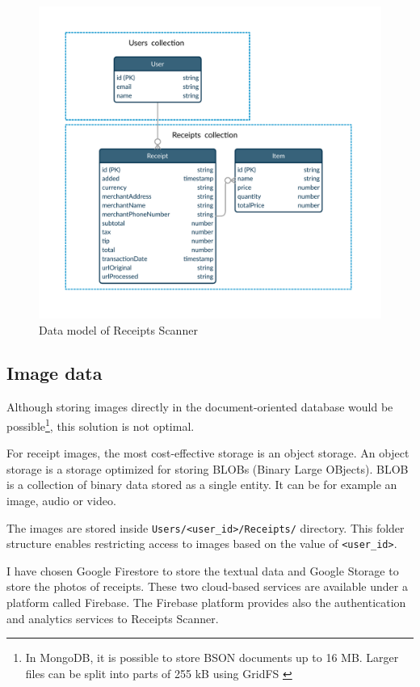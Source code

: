 \documentclass[
  digital, %
  table,   %
  oneside, %
  lof,     %
  lot,     %
]{fithesis3}
\begin{document}
    \begin{figure}
        \begin{center}
            \includegraphics[width=\textwidth]{figures/other/data_model_firestore}
        \end{center}
        \caption{Data model of Receipts Scanner}
        \label{fig:data_model_firestore}
    \end{figure}

\subsection{Image data}
Although storing images directly in the document-oriented database would be possible\footnote{In MongoDB, it is possible to store BSON documents up to 16 MB. Larger files can be split into parts of 255 kB using GridFS \cite{GridFS}}, this solution is not optimal.

For receipt images, the most cost-effective storage is an object storage. An object storage is a storage optimized for storing BLOBs (Binary Large OBjects). BLOB is a collection of binary data stored as a single entity. It can be for example an image, audio or video. 

The images are stored inside \texttt{Users/<user\_id>/Receipts/} directory. This folder structure enables restricting access to images based on the value of \texttt{<user\_id>}.

I have chosen Google Firestore to store the textual data and Google Storage to store the photos of receipts. These two cloud-based services are available under a platform called Firebase. The Firebase platform provides also the authentication and analytics services to Receipts Scanner.
\end{document}
